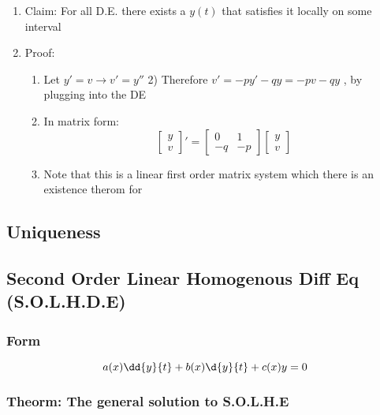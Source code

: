 \documentclass[11pt]{article}
\begin{document}
\begin{enumerate}
\item Claim: For all D.E. there exists a $y(t)$ that satisfies it
      locally on some interval
\item Proof:

\begin{enumerate}
\item Let $y'=v \rightarrow v'=y''$        2) Therefore $v'=-py'-qy=-pv-qy$ , by plugging into the DE
\item In matrix form:
          \begin{equation}
          \left [
          \begin{array}{c}
          y\\v
          \end{array} \right ]'=
          \left [
          \begin{array}{lr}
          0 & 1\\
          -q & -p
          \end{array} \right ]
          \left [
          \begin{array}{c}
          y\\v
          \end{array} \right ]
          \end{equation}
\item Note that this is a linear first order matrix system which there
          is an existence therom for
\end{enumerate}

\end{enumerate}
\subsection{Uniqueness}
\label{sec-11.3}

\subsection{Second Order Linear Homogenous Diff Eq (S.O.L.H.D.E)}
\label{sec-11.4}

\subsubsection{Form}
\label{sec-11.4.1}

    \begin{equation}
    a(x)\dd{y}{t} + b(x)\d{y}{t} + c(x)y=0
    \end{equation}
\subsubsection{Theorm: The general solution to S.O.L.H.E}
\label{sec-11.4.2}
\end{document}
